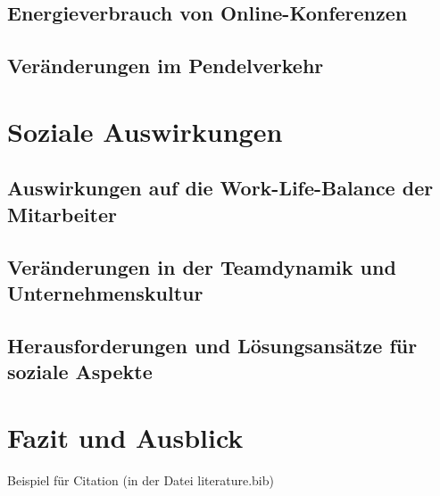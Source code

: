\documentclass[runningheads]{llncs}
\begin{document}
\subsection{Energieverbrauch von Online-Konferenzen}

\subsection{Veränderungen im Pendelverkehr}


\section{Soziale Auswirkungen}

\subsection{Auswirkungen auf die Work-Life-Balance der Mitarbeiter}

\subsection{Veränderungen in der Teamdynamik und Unternehmenskultur}

\subsection{Herausforderungen und Lösungsansätze für soziale Aspekte}


\section{Fazit und Ausblick}

Beispiel für Citation\cite{noauthor_internet-konferenz_2021}
(in der Datei literature.bib)




\end{document}
